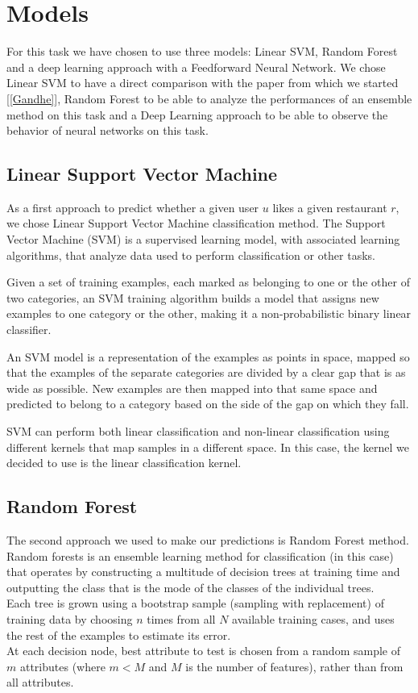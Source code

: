 
\section{Models}\label{sec:models}

For this task we have chosen to use three models: Linear SVM, Random Forest and a deep learning approach with a Feedforward Neural Network. We chose Linear SVM to have a direct comparison with the paper from which we started [\ref{Gandhe}], Random Forest to be able to analyze the performances of an ensemble method on this task and a Deep Learning approach to be able to observe the behavior of neural networks on this task.

\subsection{Linear Support Vector Machine}
As a first approach to predict whether a given user $u$ likes a given restaurant $r$, we chose Linear Support Vector Machine classification method. The Support Vector Machine (SVM) is a supervised learning model, with associated learning algorithms, that analyze data used to perform classification or other tasks.

Given a set of training examples, each marked as belonging to one or the other of two categories, an SVM training algorithm builds a model that assigns new examples to one category or the other, making it a non-probabilistic binary linear classifier.

An SVM model is a representation of the examples as points in space, mapped so that the examples of the separate categories are divided by a clear gap that is as wide as possible. New examples are then mapped into that same space and predicted to belong to a category based on the side of the gap on which they fall.

SVM can perform both linear classification and non-linear classification using different kernels that map samples in a different space. In this case, the kernel we decided to use is the linear classification kernel.


\subsection{Random Forest}
The second approach we used to make our predictions is Random Forest method. Random forests is an ensemble learning method for classification (in this case) that operates by constructing a multitude of decision trees at training time and outputting the class that is the mode of the classes of the individual trees. \\
Each tree is grown using a bootstrap sample (sampling with replacement) of training data by choosing $n$ times from all $N$ available training cases, and uses the rest of the examples to estimate its error. \\
At each decision node, best attribute to test is chosen from a random sample of $m$ attributes (where $m < M$ and $M$ is the number of features), rather than from all attributes.

